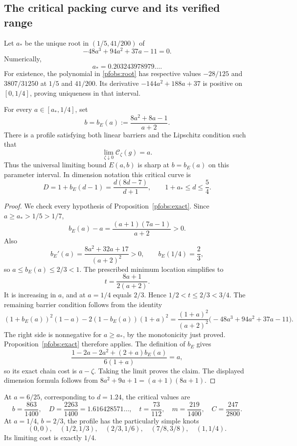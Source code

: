 \subsection{The critical packing curve and its verified range}

Let \(a_*\) be the unique root in \((1/5,41/200)\) of
\begin{equation}\label{pfobs:root}
 -48a^3+94a^2+37a-11=0.
\end{equation}
Numerically,
$$
 a_*=0.203243978979\ldots.
$$
For existence, the polynomial in \eqref{pfobs:root} has respective values
\(-28/125\) and \(3807/31250\) at \(1/5\) and \(41/200\). Its derivative
\(-144a^2+188a+37\) is positive on \([0,1/4]\), proving uniqueness in
that interval.

\begin{proposition}
\label{pfobs:critical}
For every \(a\in[a_*,1/4]\), set
$$
 b=b_E(a):=\frac{8a^2+8a-1}{a+2}.
$$
There is a profile satisfying both linear barriers and the Lipschitz condition
such that
$$
 \lim_{\zeta\downarrow0}\mathcal C_\zeta(g)=a.
$$
Thus the universal limiting bound \(E(a,b)\) is sharp at
\(b=b_E(a)\) on this parameter interval. In dimension notation this critical
curve is
$$
 D=1+b_E(d-1)=\frac{d(8d-7)}{d+1},
 \qquad 1+a_*\le d\le\frac54.
$$
\end{proposition}

\begin{proof}
We check every hypothesis of Proposition~\ref{pfobs:exact}. Since
\(a\ge a_*>1/5>1/7\),
$$
 b_E(a)-a=\frac{(a+1)(7a-1)}{a+2}>0.
$$
Also
$$
 b_E'(a)=\frac{8a^2+32a+17}{(a+2)^2}>0,
 \qquad b_E(1/4)=\frac23,
$$
so \(a\le b_E(a)\le2/3<1\). The prescribed minimum location simplifies to
$$
 t=\frac{8a+1}{2(a+2)}.
$$
It is increasing in \(a\), and at \(a=1/4\) equals \(2/3\). Hence
\(1/2<t\le2/3<3/4\).
The remaining barrier condition follows from the identity
$$
 (1+b_E(a))^2(1-a)-2(1-b_E(a))(1+a)^2
 =\frac{(1+a)^2}{(a+2)^2}
       \bigl(-48a^3+94a^2+37a-11\bigr).
$$
The right side is nonnegative for \(a\ge a_*\), by the monotonicity just
proved. Proposition~\ref{pfobs:exact} therefore applies. The definition of
\(b_E\) gives
$$
 \frac{1-2a-2a^2+(2+a)b_E(a)}{6(1+a)}=a,
$$
so its exact chain cost is \(a-\zeta\). Taking the limit proves the claim.
The displayed dimension formula follows from
\(8a^2+9a+1=(a+1)(8a+1)\).
\end{proof}

At \(a=6/25\), corresponding to \(d=1.24\), the critical values are
$$
 b=\frac{863}{1400},\quad
 D=\frac{2263}{1400}=1.616428571\ldots,\quad
 t=\frac{73}{112},\quad m=\frac{219}{1400},\quad
 C=\frac{247}{2800}.
$$
At \(a=1/4\), \(b=2/3\), the profile has the particularly simple knots
$$
 (0,0),\quad (1/2,1/3),\quad (2/3,1/6),\quad
 (7/8,3/8),\quad (1,1/4).
$$
Its limiting cost is exactly \(1/4\).

